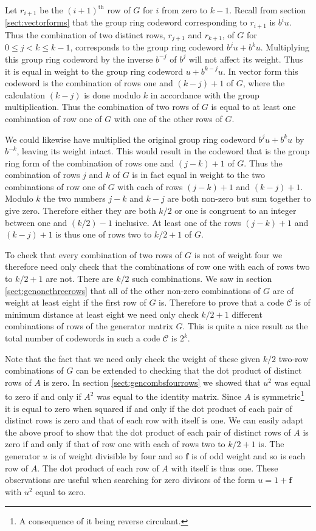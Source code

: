 Let $r_{i+1}$ be the $(i+1)^{\textrm{th}}$ row of $G$ for $i$ from zero to $k-1$.
Recall from section \ref{sect:vectorforms} that the group ring codeword corresponding to $r_{i+1}$ is $b^i u$.
Thus the combination of two distinct rows, $r_{j+1}$ and $r_{k+1}$, of $G$ for $0 \leq j < k \leq k-1$, corresponds to the group ring codeword $b^j u + b^k u$.
Multiplying this group ring codeword by the inverse $b^{-j}$ of $b^j$ will not affect its weight.
Thus it is equal in weight to the group ring codeword $u + b^{k-j} u$.
In vector form this codeword is the combination of rows one and $(k-j)+1$ of $G$, where the calculation $(k-j)$ is done modulo $k$ in accordance with the group multiplication.
Thus the combination of two rows of $G$ is equal to at least one combination of row one of $G$ with one of the other rows of $G$.

We could likewise have multiplied the original group ring codeword $b^j u + b^k u$ by $b^{-k}$, leaving its weight intact.
This would result in the codeword that is the group ring form of the combination of rows one and $(j-k)+1$ of $G$.
Thus the combination of rows $j$ and $k$ of $G$ is in fact equal in weight to the two combinations of row one of $G$ with each of rows $(j-k)+1$ and $(k-j)+1$.
Modulo $k$ the two numbers $j-k$ and $k-j$ are both non-zero but sum together to give zero.
Therefore either they are both $k/2$ or one is congruent to an integer between one and $(k/2)-1$ inclusive.
At least one of the rows $(j-k)+1$ and $(k-j)+1$ is thus one of rows two to $k/2+1$ of $G$.

To check that every combination of two rows of $G$ is not of weight four we therefore need only check that the combinations of row one with each of rows two to $k/2 + 1$ are not.
There are $k/2$ such combinations.
We saw in section \ref{sect:genonethreerows} that all of the other non-zero combinations of $G$ are of weight at least eight if the first row of $G$ is.
Therefore to prove that a code $\mathcal{C}$ is of minimum distance at least eight we need only check $k/2 +1$ different combinations of rows of the generator matrix $G$.
This is quite a nice result as the total number of codewords in such a code $\mathcal{C}$ is $2^k$.

Note that the fact that we need only check the weight of these given $k/2$ two-row combinations of $G$ can be extended to checking that the dot product of distinct rows of $A$ is zero.
In section \ref{sect:gencombsfourrows} we showed that $u^2$ was equal to zero if and only if $A^2$ was equal to the identity matrix.
Since $A$ is symmetric\footnote{A consequence of it being reverse circulant.} it is equal to zero when squared if and only if the dot product of each pair of distinct rows is zero and that of each row with itself is one.
We can easily adapt the above proof to show that the dot product of each pair of distinct rows of $A$ is zero if and only if that of row one with each of rows two to $k/2+1$ is.
The generator $u$ is of weight divisible by four and so $\mathbf{f}$ is of odd weight and so is each row of $A$.
The dot product of each row of $A$ with itself is thus one.
These observations are useful when searching for zero divisors of the form $u = 1 + \mathbf{f}$ with $u^2$ equal to zero.

